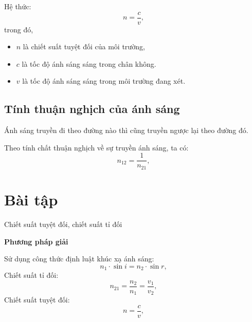 Hệ thức:
\begin{equation}
n=\dfrac{c}{v},
\end{equation}
trong đó,
\begin{itemize}
	\item $n$ là chiết suất tuyệt đối của môi trường,
	\item $c$ là tốc độ ánh sáng sáng trong chân không. 
	\item $v$ là tốc độ ánh sáng sáng trong môi trường đang xét. 
\end{itemize}



 \subsection{Tính thuận nghịch của ánh sáng}
Ánh sáng truyền đi theo đường nào thì cũng truyền ngược lại theo đường đó. 

Theo tính chất thuận nghịch về sự truyền ánh sáng, ta có: 
\begin{equation}
n_{12}=\dfrac{1}{n_{21}},
\end{equation}
 
\section{Bài tập }
\begin{dang}{Chiết suất tuyệt đối, chiết suất tỉ đối}
\end{dang}
\textbf{Phương pháp giải}

Sử dụng công thức định luật khúc xạ ánh sáng:
\begin{equation}
n_1\cdot \sin i=n_2\cdot \sin r,
\end{equation}
Chiết suất tỉ đối:
\begin{equation}
n_{21}=\dfrac{n_2}{n_1}=\dfrac{v_1}{v_2},
\end{equation}
Chiết suất tuyệt đối:
\begin{equation}
n=\dfrac{c}{v},
\end{equation}


